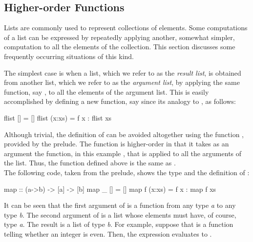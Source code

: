 \subsection{Higher-order Functions}
\label{ho-list-functions}

Lists are commonly used to represent collections of elements.
Some computations of a list can be expressed by repeatedly
applying another, somewhat simpler, computation
to all the elements of the collection.
This section discusses some frequently occurring situations
of this kind.

The simplest case is when a list, which we refer to as the
\emph{result list}, is obtained from another list,
which we refer to as the \emph{argument list}, by applying
the same function, say , to all the elements of the argument list.
This is easily accomplished by defining a new function, say
 since its analogy to , as follows:
%
\begin{curry}
flist []     = []
flist (x:xs) = f x : flist xs
\end{curry}
%
Although trivial, the definition of  can be
avoided altogether using the function ,
provided by the prelude.
The function  is higher-order in that it takes
as an argument the function, in this example ,
that is applied to all the arguments of the list.
Thus, the function  defined above
is the same as .
\\[1ex]
The following code, taken from the prelude, shows
the type and the definition of :
%
\begin{curry}
map          :: (a->b) -> [a] -> [b]
map _ []     = []
map f (x:xs) = f x : map f xs
\end{curry}
%
It can be seen that the first argument of 
is a function from any type \emph{a} to any type \emph{b}.
The second argument of  is a list whose elements
must have, of course, type \emph{a}.
The result is a list of type \emph{b}.
For example, suppose that  is a function
telling whether an integer is even.
Then, the expression 
evaluates to .

